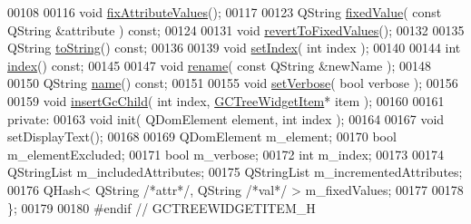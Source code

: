 \begin{DoxyCode}
00108 
00116   \textcolor{keywordtype}{void} \hyperlink{class_g_c_tree_widget_item_ada99ae07bebffd9714be294cdd3d920b}{fixAttributeValues}();
00117 
00123   QString \hyperlink{class_g_c_tree_widget_item_a62a31fad1e50915f6df144e23394abef}{fixedValue}( \textcolor{keyword}{const} QString &attribute ) \textcolor{keyword}{const};
00124 
00131   \textcolor{keywordtype}{void} \hyperlink{class_g_c_tree_widget_item_ab9be6bb99410543a6238c9ad48f2a9f7}{revertToFixedValues}();
00132 
00135   QString \hyperlink{class_g_c_tree_widget_item_acbd4573d56cc5c6d9bd58c461b797115}{toString}() \textcolor{keyword}{const};
00136 
00139   \textcolor{keywordtype}{void} \hyperlink{class_g_c_tree_widget_item_af1f6be4d3badc00db1f92de2e7deb71f}{setIndex}( \textcolor{keywordtype}{int} index );
00140 
00144   \textcolor{keywordtype}{int} \hyperlink{class_g_c_tree_widget_item_af6b48ae274cc4989811ef44944c8ad76}{index}() \textcolor{keyword}{const};
00145 
00147   \textcolor{keywordtype}{void} \hyperlink{class_g_c_tree_widget_item_a831acd54bf1060e3ec45a8e46439385a}{rename}( \textcolor{keyword}{const} QString &newName );
00148 
00150   QString \hyperlink{class_g_c_tree_widget_item_a3af8c66a690cd55986a38b996a375ba4}{name}() \textcolor{keyword}{const};  
00151 
00155   \textcolor{keywordtype}{void} \hyperlink{class_g_c_tree_widget_item_a557b0034fd98a444a7173d76a6320f4c}{setVerbose}( \textcolor{keywordtype}{bool} verbose );
00156 
00159   \textcolor{keywordtype}{void} \hyperlink{class_g_c_tree_widget_item_a197806cd712ae04b129acd1699674df5}{insertGcChild}( \textcolor{keywordtype}{int} index, \hyperlink{class_g_c_tree_widget_item}{GCTreeWidgetItem}* item );
00160 
00161 \textcolor{keyword}{private}:
00163   \textcolor{keywordtype}{void} init( QDomElement element, \textcolor{keywordtype}{int} index );
00164 
00167   \textcolor{keywordtype}{void} setDisplayText();
00168 
00169   QDomElement m\_element;
00170   \textcolor{keywordtype}{bool} m\_elementExcluded;
00171   \textcolor{keywordtype}{bool} m\_verbose;
00172   \textcolor{keywordtype}{int}  m\_index;
00173 
00174   QStringList m\_includedAttributes;
00175   QStringList m\_incrementedAttributes;
00176   QHash< QString \textcolor{comment}{/*attr*/}, QString \textcolor{comment}{/*val*/} > m\_fixedValues;
00177 
00178 \};
00179 
00180 \textcolor{preprocessor}{#endif // GCTREEWIDGETITEM\_H}
\end{DoxyCode}

